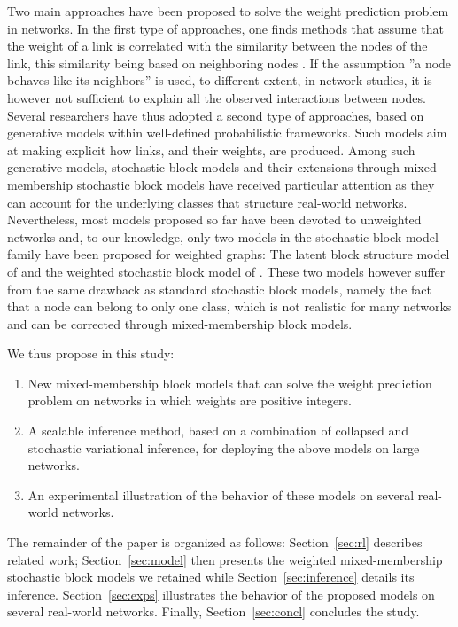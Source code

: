 Two main approaches have been proposed to solve the weight prediction problem in networks. In the first type of approaches, one finds methods that assume that the weight of a link is correlated with the similarity between the nodes of the link, this similarity being based on neighboring nodes \cite{Zhao2015,Zhu2016}. If the assumption ''a node behaves like its neighbors'' is used, to different extent, in network studies, it is however not sufficient to explain all the observed interactions between nodes. Several researchers have thus adopted a second type of approaches, based on generative models within well-defined probabilistic frameworks. Such models aim at making explicit how links, and their weights, are produced. Among such generative models, stochastic block models and their extensions through mixed-membership stochastic block models have received particular attention \cite{ Karrer2011,airoldi2009mixed,iMMSB,fan2015dynamic} as they can account for the underlying classes that structure real-world networks. Nevertheless, most models proposed so far have been devoted to unweighted networks and, to our knowledge, only two models in the stochastic block model family have been proposed for weighted graphs: The latent block structure model of \cite{aicher2014learning} and the weighted stochastic block model of \cite{peixoto2018nonparametric}. These two models however suffer from the same drawback as standard stochastic block models, namely the fact that a node can belong to only one class, which is not realistic for many networks and can be corrected through mixed-membership block models.%

We thus propose in this study:
%
\begin{enumerate}
\item New mixed-membership block models that can solve the weight prediction problem on networks in which weights are positive integers.
\item A scalable inference method, based on a combination of collapsed and stochastic variational inference, for deploying the above models on large networks.
\item An experimental illustration of the behavior of these models on several real-world networks.
\end{enumerate}
%
The remainder of the paper is organized as follows: Section~\ref{sec:rl} describes related work; Section~\ref{sec:model} then presents the weighted mixed-membership stochastic block models we retained while Section~\ref{sec:inference} details its inference. Section~\ref{sec:exps} illustrates the behavior of the proposed models on several real-world networks. Finally, Section~\ref{sec:concl} concludes the study.


